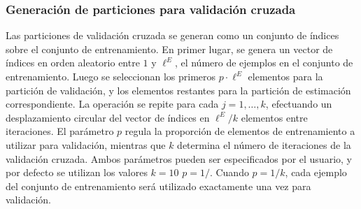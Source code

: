 %
%
\subsubsection{Generación de particiones para validación cruzada}
%
Las particiones de validación cruzada se generan como un conjunto de
índices sobre el conjunto de entrenamiento.
En primer lugar, se genera un vector de índices en orden aleatorio
entre $1$ y $\ell^E$, el número de ejemplos en el conjunto de
entrenamiento.
Luego se seleccionan los primeros $p\cdot\ell^E$ elementos para la
partición de validación, y los elementos restantes para la partición
de estimación correspondiente.
La operación se repite para cada $j=1,\ldots,k$, efectuando un
desplazamiento circular del vector de índices en $\ell^E/k$ elementos
entre iteraciones.
El parámetro $p$ regula la proporción de elementos de entrenamiento a
utilizar para validación, mientras que $k$ determina el número de
iteraciones de la validación cruzada.
Ambos parámetros pueden ser especificados por el usuario, y por
defecto se utilizan los valores $k=10$ $p=1/$.
Cuando $p=1/k$, cada ejemplo del conjunto de entrenamiento será
utilizado exactamente una vez para validación.
